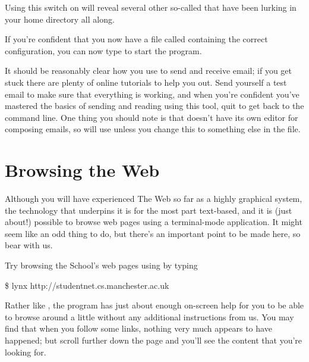 Using this switch on  will reveal several other so-called  that have been lurking in your home directory all along.

If you're confident that you now have a file called  containing the correct configuration, you can now type  to start the program. 

It should be reasonably clear how you use  to send and receive email; if you get stuck there are plenty of online tutorials to help you out. Send yourself a test email to make sure that everything is working, and when you're confident you've mastered the basics of sending and reading using this tool, quit  to get back to the command line. One thing you should note is that  doesn't have its own editor for composing emails, so will use  unless you change this to something else in the  file. 

\section{Browsing the Web}

Although you will have experienced The Web so far as a highly graphical system, the technology that underpins it is for the most part text-based, and it is (just about!) possible to browse web pages using a terminal-mode application. It might seem like an odd thing to do, but there's an important point to be made here, so bear with us.



Try browsing the School's web pages using  by typing

\begin{ttoutenv}
\$ lynx http://studentnet.cs.manchester.ac.uk
\end{ttoutenv}

Rather like , the  program has just about enough on-screen help for you to be able to browse around a little without any additional instructions from us.  You may find that when you follow some links, nothing very much appears to have happened; but scroll further down the page and you'll see the content that you're looking for.

